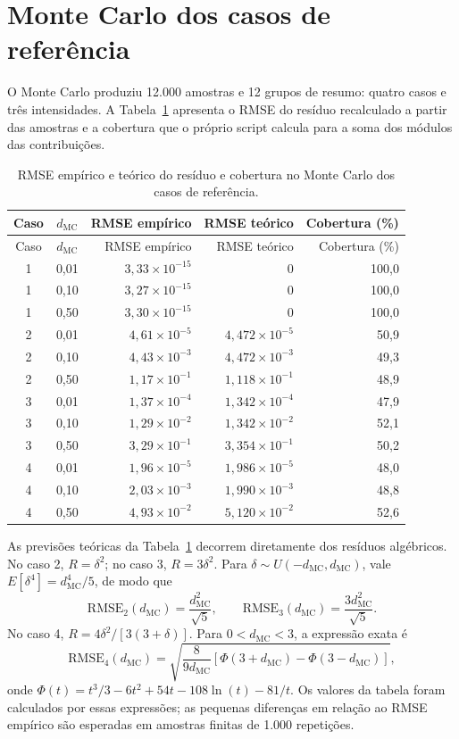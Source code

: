\documentclass[12pt,openright,oneside,a4paper,brazil]{abntex2}
\newcommand{\e}[1]{\times 10^{#1}}
\begin{document}
\section{Monte Carlo dos casos de referência}
O Monte Carlo produziu 12.000 amostras e 12 grupos de resumo: quatro casos e três intensidades. A Tabela~\ref{tab:mc} apresenta o RMSE do resíduo recalculado a partir das amostras e a cobertura que o próprio script calcula para a soma dos módulos das contribuições.
\begin{longtable}{c c r r r}
\caption{RMSE empírico e teórico do resíduo e cobertura no Monte Carlo dos casos de referência.}\label{tab:mc}\\
\toprule
Caso & $d_{\mathrm{MC}}$ & RMSE empírico & RMSE teórico & Cobertura (\%)\\
\midrule
\endfirsthead
\toprule
Caso & $d_{\mathrm{MC}}$ & RMSE empírico & RMSE teórico & Cobertura (\%)\\
\midrule
\endhead
1 & 0,01 & $3{,}33\e{-15}$ & $0$ & 100,0\\
1 & 0,10 & $3{,}27\e{-15}$ & $0$ & 100,0\\
1 & 0,50 & $3{,}30\e{-15}$ & $0$ & 100,0\\
2 & 0,01 & $4{,}61\e{-5}$ & $4{,}472\e{-5}$ & 50,9\\
2 & 0,10 & $4{,}43\e{-3}$ & $4{,}472\e{-3}$ & 49,3\\
2 & 0,50 & $1{,}17\e{-1}$ & $1{,}118\e{-1}$ & 48,9\\
3 & 0,01 & $1{,}37\e{-4}$ & $1{,}342\e{-4}$ & 47,9\\
3 & 0,10 & $1{,}29\e{-2}$ & $1{,}342\e{-2}$ & 52,1\\
3 & 0,50 & $3{,}29\e{-1}$ & $3{,}354\e{-1}$ & 50,2\\
4 & 0,01 & $1{,}96\e{-5}$ & $1{,}986\e{-5}$ & 48,0\\
4 & 0,10 & $2{,}03\e{-3}$ & $1{,}990\e{-3}$ & 48,8\\
4 & 0,50 & $4{,}93\e{-2}$ & $5{,}120\e{-2}$ & 52,6\\
\bottomrule
\end{longtable}

As previsões teóricas da Tabela~\ref{tab:mc} decorrem diretamente dos resíduos algébricos. No caso 2, $R=\delta^2$; no caso 3, $R=3\delta^2$. Para $\delta\sim U(-d_{\mathrm{MC}},d_{\mathrm{MC}})$, vale $E[\delta^4]=d_{\mathrm{MC}}^4/5$, de modo que
\begin{equation}
\mathrm{RMSE}_2(d_{\mathrm{MC}})=\frac{d_{\mathrm{MC}}^2}{\sqrt{5}},\qquad
\mathrm{RMSE}_3(d_{\mathrm{MC}})=\frac{3d_{\mathrm{MC}}^2}{\sqrt{5}}.
\end{equation}
No caso 4, $R=4\delta^2/[3(3+\delta)]$. Para $0<d_{\mathrm{MC}}<3$, a expressão exata é
\begin{equation}
\mathrm{RMSE}_4(d_{\mathrm{MC}})=\sqrt{\frac{8}{9d_{\mathrm{MC}}}\left[\Phi(3+d_{\mathrm{MC}})-\Phi(3-d_{\mathrm{MC}})\right]},
\end{equation}
onde $\Phi(t)=t^3/3-6t^2+54t-108\ln(t)-81/t$. Os valores da tabela foram calculados por essas expressões; as pequenas diferenças em relação ao RMSE empírico são esperadas em amostras finitas de 1.000 repetições.
\end{document}
